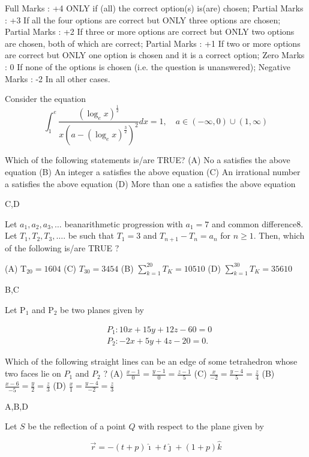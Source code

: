 Full Marks : +4 ONLY if (all) the correct option(s) is(are) chosen;
Partial Marks : +3 If all the four options are correct but ONLY three options are chosen;
Partial Marks : +2 If three or more options are correct but ONLY two options are chosen, both of which are correct;
Partial Marks : +1 If two or more options are correct but ONLY one option is chosen and it is a correct option;
Zero Marks : 0 If none of the options is chosen (i.e. the question is unanswered);
Negative Marks : -2 In all other cases.


Consider the equation
$$
\int_{1}^{e} \frac{\left(\log _{e} x\right)^{\frac{1}{2}}}{x\left(a-\left(\log _{e} x\right)^{\frac{3}{2}}\right)^{2}} d x=1, \quad a \in(-\infty, 0) \cup(1, \infty)
$$

Which of the following statements is/are TRUE?
(A) No a satisfies the above equation
(B) An integer a satisfies the above equation
(C) An irrational number a satisfies the above equation
(D) More than one a satisfies the above equation

C,D

Let $a_{1}, a_{2}, a_{3}, \ldots$ beanarithmetic progression with $a_{1}=7$ and common difference8. Let $T_{1}, T_{2}, T_{3}, \ldots$. be such that $T_{1}=3$ and $T_{n+1}-T_{n}=a_{n}$ for $n \geq 1$. Then, which of the following is/are TRUE $?$

(A) $\mathrm{T}_{20}=1604$
(C) $T_{30}=3454$
(B) $\sum_{k=1}^{20} T_{K}=10510$
(D) $\sum_{k=1}^{30} T_{K}=35610$

B,C

Let $\mathrm{P}_{1}$ and $\mathrm{P}_{2}$ be two planes given by

$$
\begin{aligned}
& P_{1}: 10 x+15 y+12 z-60=0 \\
& P_{2}:-2 x+5 y+4 z-20=0 .
\end{aligned}
$$

Which of the following straight lines can be an edge of some tetrahedron whose two faces lie on $P_{1}$ and $P_{2}$ ?
(A) $\frac{x-1}{0}=\frac{y-1}{0}=\frac{z-1}{5}$
(C) $\frac{x}{-2}=\frac{y-4}{5}=\frac{z}{4}$
(B) $\frac{x-6}{-5}=\frac{y}{2}=\frac{z}{3}$
(D) $\frac{x}{1}=\frac{y-4}{-2}=\frac{z}{3}$

A,B,D


Let $S$ be the reflection of a point $Q$ with respect to the plane given by

$$
\vec{r}=-(t+p) \hat{\imath}+t \hat{\jmath}+(1+p) \hat{k}
$$


